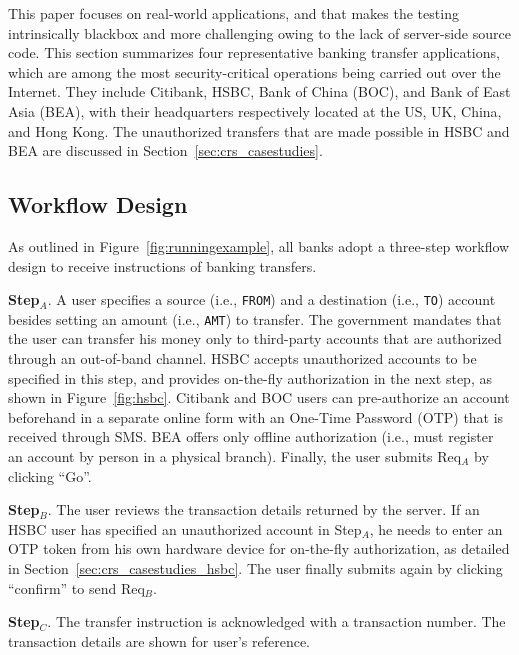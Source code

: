 \documentclass[letter]{sig-alternate-2013}
\begin{document}
This paper focuses on real-world applications, and that makes the testing intrinsically blackbox and more challenging owing to the lack of server-side source code. This section summarizes four representative banking transfer applications, which are among the most security-critical operations being carried out over the Internet. They include Citibank, HSBC, Bank of China (BOC), and Bank of East Asia (BEA), with their headquarters respectively located at the US, UK, China, and Hong Kong. The unauthorized transfers that are made possible in HSBC and BEA are discussed in Section~\ref{sec:crs_casestudies}.

\subsection{Workflow Design}

As outlined in Figure~\ref{fig:runningexample}, all banks adopt a three-step workflow design to receive instructions of banking transfers. 

\textbf{Step$_A$}. A user specifies a source (i.e., \verb"FROM") and a destination (i.e., \verb"TO") account besides setting an amount (i.e., \verb"AMT") to transfer. The government mandates that the user can transfer his money only to third-party accounts that are authorized through an out-of-band channel. HSBC accepts unauthorized accounts to be specified in this step, and provides on-the-fly authorization in the next step, as shown in Figure~\ref{fig:hsbc}. Citibank and BOC users can pre-authorize an account beforehand in a separate online form with an One-Time Password (OTP) that is received through SMS. BEA offers only offline authorization (i.e., must register an account by person in a physical branch). Finally, the user submits Req$_A$ by clicking ``Go''.

\textbf{Step$_B$}. The user reviews the transaction details returned by the server. If an HSBC user has specified an unauthorized account in Step$_A$, he needs to enter an OTP token from his own hardware device for on-the-fly authorization, as detailed in Section~\ref{sec:crs_casestudies_hsbc}. The user finally submits again by clicking ``confirm'' to send Req$_B$.  

\textbf{Step$_C$}. The transfer instruction is acknowledged with a transaction number. The transaction details are shown for user's reference.
\end{document}
